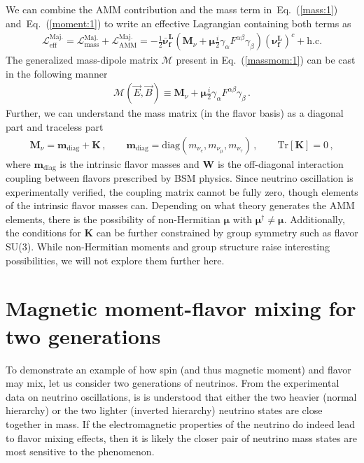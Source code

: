 \documentclass[a4paper]{article}
\newcommand*{\bb}{\boldsymbol}
\newcommand{\req}[1]{Eq.~(\ref{#1})}
\begin{document}
We can combine the AMM contribution and the mass term in~\req{mass:1} and~\req{moment:1} to write an effective Lagrangian containing both terms as
\begin{align}
	\label{massmom:1}
    \mathcal{L}_\mathrm{eff}^\mathrm{Maj.}=\mathcal{L}_\mathrm{mass}^\mathrm{Maj.} + \mathcal{L}_\mathrm{AMM}^\mathrm{Maj.}=-\frac{1}{2}\bb{\bar{\nu}_{f}^{L}}\left(\bb{M}_{\nu}+\bb{\mu}\frac{i}{2}\gamma_{\alpha}F^{\alpha\beta}\gamma_{\beta}\right)\left(\bb{\nu_{f}^{L}}\right)^{c}+\mathrm{h.c.}
\end{align}
The generalized mass-dipole matrix $\bb{\mathcal M}$ present in \req{massmom:1} can be cast in the following manner
\begin{align}
	\label{massmom:2}
    {\bb{\mathcal{M}}}(\vec{E},\vec{B})\equiv\bb{M}_{\nu}+\bb{\mu}\frac{i}{2}\gamma_{\alpha}F^{\alpha\beta}\gamma_{\beta}\,.
\end{align}
Further, we can understand the mass matrix (in the flavor basis) as a diagonal part and traceless part
\begin{align}
	\label{massmom:3}
    \bb{M}_{\nu}=\bb{m}_\mathrm{diag}+\bb{K}\,,\qquad
    \bb{m}_\mathrm{diag}=\mathrm{diag}(m_{\nu_{e}},m_{\nu_{\mu}},m_{\nu_{\tau}})\,,\qquad
    \mathrm{Tr}\left[\bb{K}\right] = 0 \,,
\end{align}
where $\bb{m}_\mathrm{diag}$ is the intrinsic flavor masses and $\bb{W}$ is the off-diagonal interaction coupling between flavors prescribed by BSM physics. Since neutrino oscillation is experimentally verified, the coupling matrix cannot be fully zero, though elements of the intrinsic flavor masses can. Depending on what theory generates the AMM elements, there is the possibility of non-Hermitian $\bb{\mu}$ with $\bb{\mu}^{\dagger}\neq\bb{\mu}$. Additionally, the conditions for $\bb{K}$ can be further constrained by group symmetry such as flavor SU(3). While non-Hermitian moments and group structure raise interesting possibilities, we will not explore them further here.

\section{Magnetic moment-flavor mixing for two generations}
\label{sec:mix}
\noindent To demonstrate an example of how spin (and thus magnetic moment) and flavor may mix, let us consider two generations of neutrinos. From the experimental data on neutrino oscillations, is is understood that either the two heavier (normal hierarchy) or the two lighter (inverted hierarchy) neutrino states are close together in mass. If the electromagnetic properties of the neutrino do indeed lead to flavor mixing effects, then it is likely the closer pair of neutrino mass states are most sensitive to the phenomenon.
\end{document}
